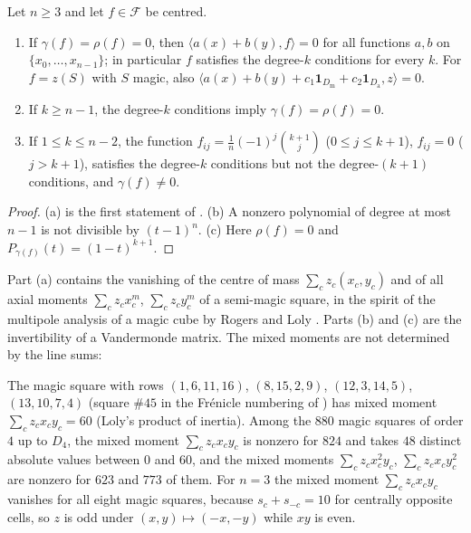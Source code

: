 \begin{proposition}
\label{prop:hierarchy}
Let $n\ge3$ and let $f\in\mathcal F$ be centred.
\begin{enumerate}
\item[(a)] If $\gamma(f)=\rho(f)=0$, then $\langle a(x)+b(y),f\rangle=0$ for all functions $a,b$ on $\{x_0,\dots,x_{n-1}\}$; in particular $f$ satisfies the degree-$k$ conditions for every $k$.
For $f=z(S)$ with $S$ magic, also $\langle a(x)+b(y)+c_1\mathbf 1_{D_{\mathrm m}}+c_2\mathbf 1_{D_{\mathrm a}},z\rangle=0$.
\item[(b)] If $k\ge n-1$, the degree-$k$ conditions imply $\gamma(f)=\rho(f)=0$.
\item[(c)] If $1\le k\le n-2$, the function $f_{ij}=\frac1n(-1)^{j}\binom{k+1}{j}$ ($0\le j\le k+1$), $f_{ij}=0$ ($j>k+1$), satisfies the degree-$k$ conditions but not the degree-$(k+1)$ conditions, and $\gamma(f)\ne0$.
\end{enumerate}
\end{proposition}

\begin{proof}
(a) is the first statement of .  (b) A nonzero polynomial of degree at most $n-1$ is not divisible by $(t-1)^{n}$.  (c) Here $\rho(f)=0$ and $P_{\gamma(f)}(t)=(1-t)^{k+1}$.
\end{proof}

Part (a) contains the vanishing of the centre of mass $\sum_cz_c(x_c,y_c)$ and of all axial moments $\sum_cz_cx_c^m$, $\sum_cz_cy_c^m$ of a semi-magic square, in the spirit of the multipole analysis of a magic cube by Rogers and Loly \cite{rogers2005multipole}.
Parts (b) and (c) are the invertibility of a Vandermonde matrix.
The mixed moments are not determined by the line sums:

\begin{remark}
\label{rem:product_inertia}
The magic square with rows $(1,6,11,16)$, $(8,15,2,9)$, $(12,3,14,5)$, $(13,10,7,4)$ (square $\#45$ in the Fr\'enicle numbering of \cite{mathewson_gems}) has mixed moment $\sum_cz_cx_cy_c=60$ (Loly's product of inertia).
Among the $880$ magic squares of order $4$ up to $D_4$, the mixed moment $\sum_cz_cx_cy_c$ is nonzero for $824$ and takes $48$ distinct absolute values between $0$ and $60$, and the mixed moments $\sum_cz_cx_c^2y_c$, $\sum_cz_cx_cy_c^2$ are nonzero for $623$ and $773$ of them.
For $n=3$ the mixed moment $\sum_cz_cx_cy_c$ vanishes for all eight magic squares, because $s_c+s_{-c}=10$ for centrally opposite cells, so $z$ is odd under $(x,y)\mapsto(-x,-y)$ while $xy$ is even.
\end{remark}

